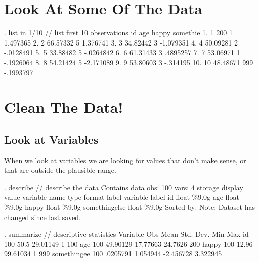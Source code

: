 \documentclass[]{article}
\begin{document}
\section{Look At Some Of The Data}\label{look-at-some-of-the-data}

\begin{stlog}
. list in 1/10 // list first 10 observations
{\smallskip}
     {\TLC}
     {\VBAR} id        age   happy   somethi{\tytilde}e {\VBAR}
     {\LFTT}
  1. {\VBAR}  1        200       1    1.497365 {\VBAR}
  2. {\VBAR}  2   66.57332       5    1.376741 {\VBAR}
  3. {\VBAR}  3   34.82442       3   -1.079351 {\VBAR}
  4. {\VBAR}  4   50.09281       2   -.0128491 {\VBAR}
  5. {\VBAR}  5   33.88482       5   -.0264842 {\VBAR}
     {\LFTT}
  6. {\VBAR}  6   61.31433       3    .4895257 {\VBAR}
  7. {\VBAR}  7   53.06971       1   -.1926064 {\VBAR}
  8. {\VBAR}  8   54.21424       5   -2.171089 {\VBAR}
  9. {\VBAR}  9   53.80603       3    -.314195 {\VBAR}
 10. {\VBAR} 10   48.48671     999   -.1993797 {\VBAR}
     {\BLC}
\end{stlog}

\section{Clean The Data!}\label{clean-the-data}

\subsection{Look at Variables}\label{look-at-variables}

When we look at variables we are looking for values that don't make
sense, or that are outside the plausible range.

\begin{stlog}
. describe // describe the data
{\smallskip}
Contains data
  obs:           100                          
 vars:             4                          
              storage   display    value
variable name   type    format     label      variable label
id              float   \%9.0g                 
age             float   \%9.0g                 
happy           float   \%9.0g                 
somethingelse   float   \%9.0g                 
Sorted by: 
     Note: Dataset has changed since last saved.
\end{stlog}

\begin{stlog}
. summarize // descriptive statistics
{\smallskip}
    Variable {\VBAR}        Obs        Mean    Std. Dev.       Min        Max
          id {\VBAR}        100        50.5    29.01149          1        100
         age {\VBAR}        100    49.90129    17.77663    24.7626        200
       happy {\VBAR}        100       12.96    99.61034          1        999
somethinge{\tytilde}e {\VBAR}        100    .0205791    1.054944  -2.456728   3.322945
\end{stlog}
\end{document}
